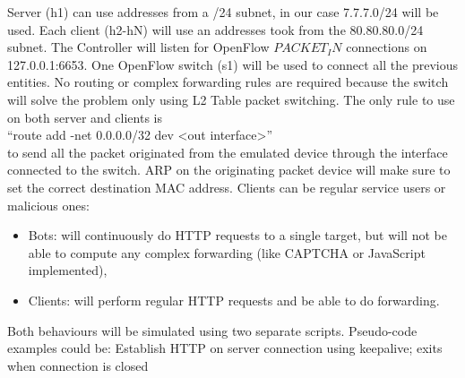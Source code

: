 Server (h1) can use addresses from a /24 subnet, in our case 7.7.7.0/24 will be used.
Each client (h2-hN) will use an addresses took from the 80.80.80.0/24 subnet.
The Controller will listen for OpenFlow $PACKET_IN$ connections on 127.0.0.1:6653.
One OpenFlow switch (s1) will be used to connect all the previous entities. No routing or complex forwarding rules are required because the switch will solve the problem only using L2 Table packet switching. The only rule to use on both server and clients is \\
“route add -net 0.0.0.0/32 dev <out interface>”
\\
to send all the packet originated from the emulated device through the interface connected to the switch. ARP on the originating packet device will make sure to set the correct destination MAC address.
Clients can be regular service users or malicious ones:
\begin{itemize}
	\item Bots: will continuously do HTTP requests to a single target, but will not be able to compute any complex forwarding (like CAPTCHA or JavaScript implemented),
	\item Clients: will perform regular HTTP requests and be able to do forwarding.
\end{itemize}	
Both behaviours will be simulated using two separate scripts. Pseudo-code examples could be:
	Establish HTTP on server connection using keepalive; exits when connection is closed


